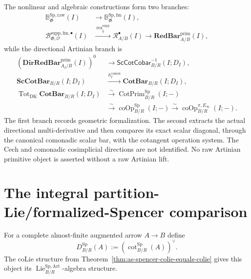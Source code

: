 \begin{remark}
The nonlinear and algebraic constructions form two branches:
\[
\boxed{
\begin{aligned}
\mathbb B_{\mathfrak G}^{\mathrm{Sp,raw}}(I)
&\longrightarrow
\mathbb B_{\mathfrak G}^{\mathrm{Sp,fm}}(I),\\
\mathscr B^{\mathrm{supp,fm},\bullet}_{\mathfrak G,\mathcal O}(I)
&\xrightarrow{\ \operatorname{res}^{\mathrm{supp}}_{\widetilde q}\ }
\mathscr R_{A/B}^{\bullet}(I)
\longrightarrow
\mathbf{RedBar}^{\mathrm{prim}}_{A/B}(I),
\end{aligned}}
\]
while the directional Artinian branch is
\[
\boxed{
\begin{aligned}
\left(\mathbf{DirRedBar}^{\mathrm{prim}}_{A_I/B}(I)\right)^0
&\longrightarrow
\mathsf{ScCotCobar}^{-1}_{B/R}(I;D_I),\\
\mathbf{ScCotBar}_{B/R}(I;D_I)
&\xrightarrow{h_I^{\mathrm{comon}}}
\mathbf{CotBar}_{B/R}(I;D_I),\\
\operatorname{Tot}_{\mathrm{DK}}\mathbf{CotBar}_{B/R}(I;D_I)
&\xrightarrow{\sim}
\operatorname{CotPrim}^{\mathrm{Sp}}_{B/R}(I;-)\\
&\xrightarrow{\sim}
\operatorname{coOp}^{\mathrm{Sp}}_{B/R}(I;-)
\xrightarrow{\sim}
\operatorname{coOp}^{\pi,E_\infty}_{B/R}(I;-).
\end{aligned}}
\]
The first branch records geometric formalization.  The second extracts the
actual directional multi-derivative and then compares its exact scalar
diagonal, through the canonical comonadic scalar bar, with the cotangent
operation system.  The Cech and comonadic cosimplicial directions are not
identified.  No raw Artinian primitive object is asserted without a raw
Artinian lift.
\end{remark}

\section{The integral partition-Lie/formalized-Spencer comparison}
\label{sec:as-partition-spencer-comparison}

For a complete almost-finite augmented arrow $A\to B$ define
\[
\boxed{
    D_{B/R}^{\mathrm{Sp}}(A)
    :=
    \left(
        \operatorname{cot}_{B/R}^{\mathrm{Sp}}(A)
    \right)^\vee.
}
\]
The coLie structure from
Theorem~\ref{thm:as-spencer-colie-equals-colie} gives this object its
$\operatorname{Lie}^{\mathrm{Sp,Art}}_{B/R}$-algebra structure.

